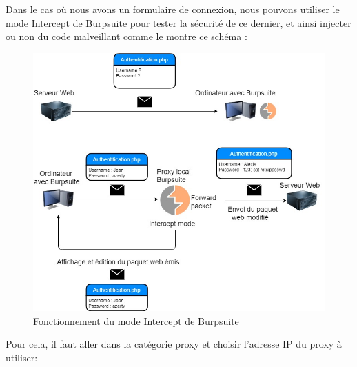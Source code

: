  Dans le cas où nous avons un formulaire de connexion, nous pouvons utiliser le mode Intercept de Burpsuite pour tester la sécurité de ce dernier, et ainsi injecter ou non du code malveillant comme le montre ce schéma :

\begin{figure}[htp!]
  \centering
  \setlength\figureheight{7cm}
  \setlength\figurewidth{9cm}
  \includegraphics[width=1\textwidth]{oui/Ancien/imangeancien/burpsuite/Burpsuite-Fonctionnement.jpg}
  \caption{Fonctionnement du mode Intercept de Burpsuite}
  \label{fig:courbe-tikz}
\end{figure}

\newpage
 Pour cela, il faut aller dans la catégorie proxy et choisir l’adresse IP du proxy à utiliser:

